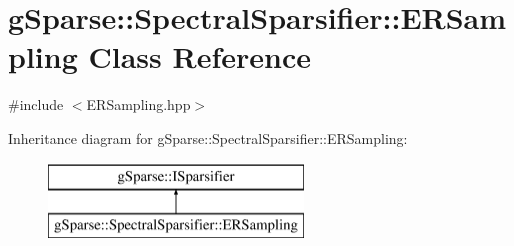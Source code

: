 \hypertarget{classg_sparse_1_1_spectral_sparsifier_1_1_e_r_sampling}{}\section{g\+Sparse\+:\+:Spectral\+Sparsifier\+:\+:E\+R\+Sampling Class Reference}
\label{classg_sparse_1_1_spectral_sparsifier_1_1_e_r_sampling}


{\ttfamily \#include $<$E\+R\+Sampling.\+hpp$>$}

Inheritance diagram for g\+Sparse\+:\+:Spectral\+Sparsifier\+:\+:E\+R\+Sampling\+:\begin{figure}[H]
\begin{center}
\leavevmode
\includegraphics[height=2.000000cm]{classg_sparse_1_1_spectral_sparsifier_1_1_e_r_sampling}
\end{center}
\end{figure}
